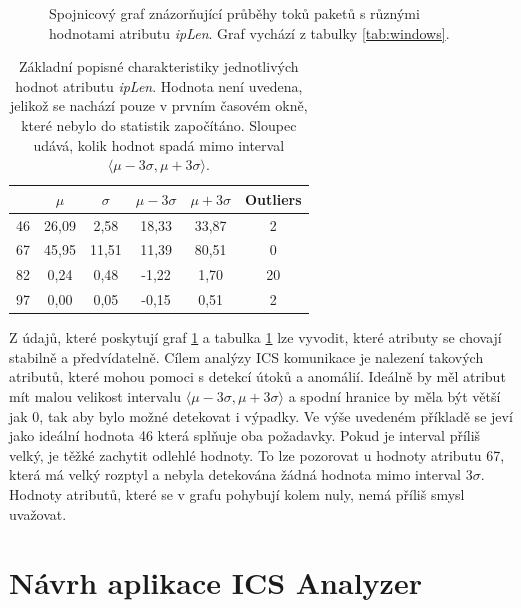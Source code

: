 \begin{figure}[H]
	\centering
	\resizebox{1\textwidth}{!}
    {
        
    }
    \caption{Spojnicový graf znázorňující průběhy toků paketů s různými hodnotami atributu \emph{ipLen}. Graf vychází z tabulky \ref{tab:windows}.}
	\label{graph_attributes}
\end{figure}


\begin{table}[H]
\centering
\begin{tabular}{|c|c|c|c|c|c|}
\hline
   & $\mu$ & $\sigma$ & $\mu - 3 \sigma$ & $\mu + 3 \sigma$ & Outliers \\ \hline
46 & 26,09 & 2,58     & 18,33            & 33,87            & 2         \\ \hline
67 & 45,95 & 11,51    & 11,39            & 80,51            & 0         \\ \hline
82 & 0,24  & 0,48     & -1,22            & 1,70             & 20        \\ \hline
97 & 0,00  & 0,05     & -0,15            & 0,51             & 2         \\ \hline
\end{tabular}
\caption{Základní popisné charakteristiky jednotlivých hodnot atributu \emph{ipLen}. Hodnota  není uvedena, jelikož se nachází pouze v prvním časovém okně, které nebylo do statistik započítáno. Sloupec  udává, kolik hodnot spadá mimo interval $\langle{\mu-3\sigma,\mu+3\sigma}\rangle$.}
\label{tab:attribute_characteristic}
\end{table}

Z údajů, které poskytují graf \ref{graph_attributes} a tabulka \ref{tab:attribute_characteristic} lze vyvodit, které atributy se chovají stabilně a předvídatelně. Cílem analýzy ICS komunikace je nalezení takových atributů, které mohou pomoci s detekcí útoků a anomálií. Ideálně by měl atribut mít malou velikost intervalu $\langle{\mu-3\sigma,\mu+3\sigma}\rangle$ a spodní hranice by měla být větší jak 0, tak aby bylo možné detekovat i výpadky. Ve výše uvedeném příkladě se jeví jako ideální hodnota 46 která splňuje oba požadavky. Pokud je interval příliš velký, je těžké zachytit odlehlé hodnoty. To lze pozorovat u hodnoty atributu 67, která má velký rozptyl a nebyla detekována žádná hodnota mimo interval $3\sigma$. Hodnoty atributů, které se v grafu pohybují kolem nuly, nemá příliš smysl uvažovat.


\chapter{Návrh aplikace ICS Analyzer}
\label{chapter_design}

